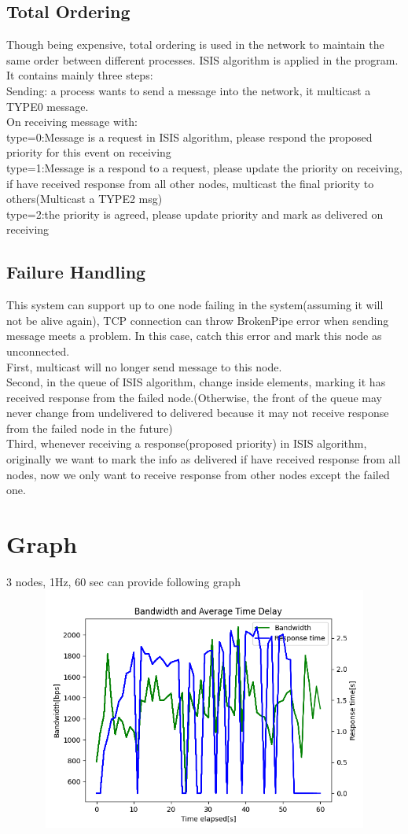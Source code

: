 \documentclass{article}
\begin{document}
\subsection{Total Ordering}
Though being expensive, total ordering is used in the network to maintain the same order between different processes. ISIS algorithm is applied in the program.\\
It contains mainly three steps:\\
Sending: a process wants to send a message into the network, it multicast a TYPE0 message.\\
On receiving message with: \\
type=0:Message is a request in ISIS algorithm, please respond the proposed priority for this event on receiving\\
type=1:Message is a respond to a request, please update the priority on receiving, if have received response from all other nodes, multicast the final priority to others(Multicast a TYPE2 msg)\\
type=2:the priority is agreed, please update priority and mark as delivered on receiving\\

\subsection{Failure Handling}
This system can support up to one node failing in the system(assuming it will not be alive again), TCP connection can throw BrokenPipe error when sending message meets a problem. In this case, catch this error and mark this node as unconnected.\\
First, multicast will no longer send message to this node.\\
Second, in the queue of ISIS algorithm, change inside elements, marking it has received response from the failed node.(Otherwise, the front of the queue may never change from undelivered to delivered because it may not receive response from the failed node in the future)\\
Third, whenever receiving a response(proposed priority) in ISIS algorithm, originally we want to mark the info as delivered if have received response from all nodes, now we only want to receive response from other nodes except the failed one.

\section{Graph}
3 nodes, 1Hz, 60 sec can provide following graph\\
\includegraphics[height=8cm, width=18cm]{60.png}\\
\end{document}
